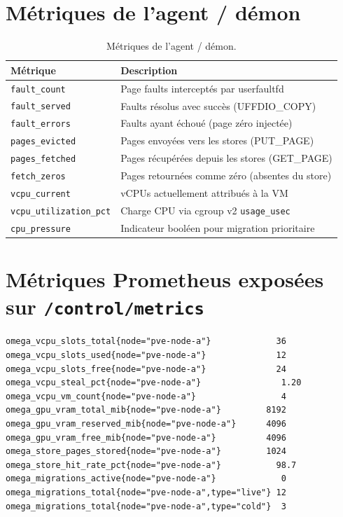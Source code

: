 \section{Métriques de l'agent / démon}

\begin{table}[H]
\centering
\small
\begin{tabular}{p{4.2cm}p{8.5cm}}
\toprule
\textbf{Métrique} & \textbf{Description} \\
\midrule
\texttt{fault\_count}             & Page faults interceptés par userfaultfd \\
\texttt{fault\_served}            & Faults résolus avec succès (UFFDIO\_COPY) \\
\texttt{fault\_errors}            & Faults ayant échoué (page zéro injectée) \\
\texttt{pages\_evicted}           & Pages envoyées vers les stores (PUT\_PAGE) \\
\texttt{pages\_fetched}           & Pages récupérées depuis les stores (GET\_PAGE) \\
\texttt{fetch\_zeros}             & Pages retournées comme zéro (absentes du store) \\
\texttt{vcpu\_current}            & vCPUs actuellement attribués à la VM \\
\texttt{vcpu\_utilization\_pct}   & Charge CPU via cgroup v2 \texttt{usage\_usec} \\
\texttt{cpu\_pressure}            & Indicateur booléen pour migration prioritaire \\
\bottomrule
\end{tabular}
\caption{Métriques de l'agent / démon.}
\end{table}

\section{Métriques Prometheus exposées sur \texttt{/control/metrics}}

\begin{lstlisting}[basicstyle=\ttfamily\scriptsize, frame=single]
omega_vcpu_slots_total{node="pve-node-a"}             36
omega_vcpu_slots_used{node="pve-node-a"}              12
omega_vcpu_slots_free{node="pve-node-a"}              24
omega_vcpu_steal_pct{node="pve-node-a"}                1.20
omega_vcpu_vm_count{node="pve-node-a"}                 4
omega_gpu_vram_total_mib{node="pve-node-a"}         8192
omega_gpu_vram_reserved_mib{node="pve-node-a"}      4096
omega_gpu_vram_free_mib{node="pve-node-a"}          4096
omega_store_pages_stored{node="pve-node-a"}         1024
omega_store_hit_rate_pct{node="pve-node-a"}           98.7
omega_migrations_active{node="pve-node-a"}             0
omega_migrations_total{node="pve-node-a",type="live"} 12
omega_migrations_total{node="pve-node-a",type="cold"}  3
\end{lstlisting}

